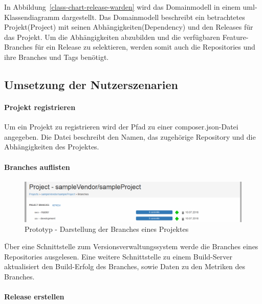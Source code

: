 \vspace{2em}

In Abbildung~\ref{class-chart-release-warden} wird das Domainmodell in einem \acs{uml}-Klassendiagramm dargestellt. Das Domainmodell beschreibt ein betrachtetes Projekt(Project) mit seinen Abhängigkeiten(Dependency) und den Releases für das Projekt. 
Um die Abhängigkeiten abzubilden und die verfügbaren Feature-Branches für ein Release zu selektieren, werden somit auch die Repositories und ihre Branches und Tags benötigt.

\subsection{Umsetzung der Nutzerszenarien}

\paragraph{Projekt registrieren}

Um ein Projekt zu registrieren wird der Pfad zu einer \glqq composer.json\grqq{}-Datei angegeben. Die Datei beschreibt den Namen, das zugehörige Repository und die Abhängigkeiten des Projektes.

\paragraph{Branches auflisten}

\begin{figure}[h]
  \includegraphics[width=\textwidth, height=\textheight, keepaspectratio]
  {resources/prototype-project-show-branches.pdf}
  \caption{Prototyp - Darstellung der Branches eines Projektes}
  \label{prototype-project-show-branches}
\end{figure}

Über eine Schnittstelle zum Versionsverwaltungssystem werde die Branches eines Repositories ausgelesen. Eine weitere Schnittstelle zu einem Build-Server aktualisiert den Build-Erfolg des Branches, sowie Daten zu den Metriken des Branches.

\paragraph{Release erstellen}

